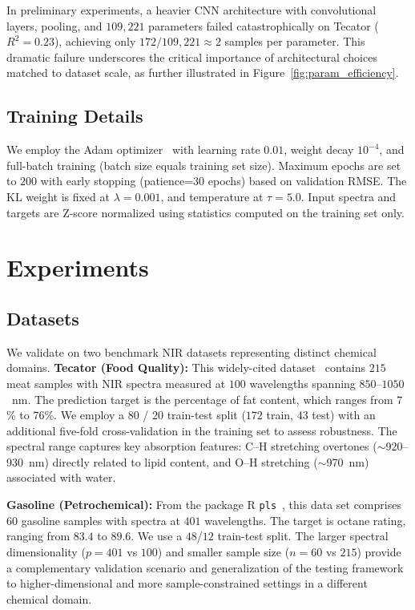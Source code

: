 \documentclass[preprint,12pt]{elsarticle}
\begin{document}
In preliminary experiments, a heavier CNN architecture with convolutional layers, pooling, and $109,221$ parameters failed catastrophically on Tecator ($R^2=0.23$), achieving only $172/109,221 \approx 2$ samples per parameter. This dramatic failure underscores the critical importance of architectural choices matched to dataset scale, as further illustrated in Figure~\ref{fig:param_efficiency}.

\subsection{Training Details}

We employ the Adam optimizer~\cite{kingma2015adam} with learning rate $0.01$, weight decay $10^{-4}$, and full-batch training (batch size equals training set size). Maximum epochs are set to $200$ with early stopping (patience=$30$ epochs) based on validation RMSE. The KL weight is fixed at $\lambda=0.001$, and temperature at $\tau=5.0$. Input spectra and targets are Z-score normalized using statistics computed on the training set only.

\section{Experiments}

\subsection{Datasets}

We validate on two benchmark NIR datasets representing distinct chemical domains.
\textbf{Tecator (Food Quality):} This widely-cited dataset~\cite{toenessen1991fat} contains $215$ meat samples with NIR spectra measured at $100$ wavelengths spanning $850$--$1050$~nm. The prediction target is the percentage of fat content, which ranges from $7$\% to $76$\%. We employ a $80$ / $20$ train-test split ($172$ train, $43$ test) with an additional five-fold cross-validation in the training set to assess robustness. The spectral range captures key absorption features: C--H stretching overtones ($\sim$920--930~nm) directly related to lipid content, and O--H stretching ($\sim$970~nm) associated with water.

\textbf{Gasoline (Petrochemical):} From the package R \texttt{pls}~\cite{mevik2007pls}, this data set comprises $60$ gasoline samples with spectra at $401$ wavelengths. The target is octane rating, ranging from $83.4$ to $89.6$. We use a $48$/$12$ train-test split. The larger spectral dimensionality ($p=401$ vs $100$) and smaller sample size ($n=60$ vs $215$) provide a complementary validation scenario and generalization of the testing framework to higher-dimensional and more sample-constrained settings in a different chemical domain.
\end{document}
